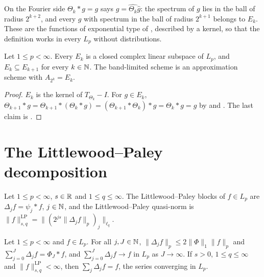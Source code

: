 On the Fourier side $\Theta_k * g = g$ says $\widehat g = \widehat{\Theta_k} \widehat g$: the
spectrum of $g$ lies in the ball of radius $2^{k+2}$, and every $g$ with spectrum in the ball of
radius $2^{k+1}$ belongs to $E_k$. These are the functions of exponential type of
\cite{Nikolskii}, described by a kernel, so that the definition works in every $L_p$ without
distributions.

\begin{lemma}
\label{lem:band-space}
\leanok
{}
Let $1 \leq p < \infty$. Every $E_k$ is a closed complex linear subspace of $L_p$, and
$E_k \subseteq E_{k+1}$ for every $k \in \mathbb{N}$. The band-limited scheme is an approximation scheme
with $A_{2^k} = E_k$.
\end{lemma}

\begin{proof}
\leanok
$E_k$ is the kernel of $T_{\Theta_k} - I$. For $g \in E_k$,
$\Theta_{k+1} * g = \Theta_{k+1} * (\Theta_k * g) = (\Theta_{k+1} * \Theta_k) * g
= \Theta_k * g = g$ by  and . The last claim is
.
\end{proof}

\section{The Littlewood--Paley decomposition}

\begin{definition}
\label{def:lp-blocks}
\leanok
{}
Let $1 \leq p < \infty$, $s \in \mathbb{R}$ and $1 \leq q \leq \infty$. The Littlewood--Paley blocks of
$f \in L_p$ are $\Delta_j f = \psi_j * f$, $j \in \mathbb{N}$, and the Littlewood--Paley quasi-norm is
$\|f\|^{\mathrm{LP}}_{s,q} = \|(2^{js} \|\Delta_j f\|_p)_j\|_{\ell_q}$.
\end{definition}

\begin{lemma}
\label{lem:lp-blocks}
\leanok
{}
Let $1 \leq p < \infty$ and $f \in L_p$. For all $j, J \in \mathbb{N}$,
$\|\Delta_j f\|_p \leq 2 \|\Phi\|_1 \|f\|_p$ and $\sum_{j=0}^J \Delta_j f = \Phi_J * f$, and
$\sum_{j=0}^J \Delta_j f \to f$ in $L_p$ as $J \to \infty$. If $s > 0$, $1 \leq q \leq \infty$
and $\|f\|^{\mathrm{LP}}_{s,q} < \infty$, then $\sum_j \Delta_j f = f$, the series converging
in $L_p$.
\end{lemma}

